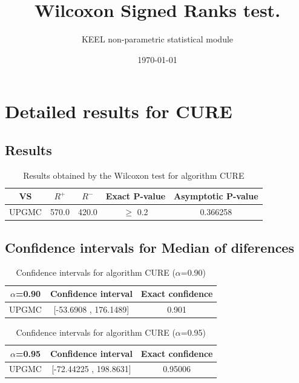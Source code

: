 \documentclass[a4paper,10pt]{article}
\title{Wilcoxon Signed Ranks test.}
\date{\today}
\author{KEEL non-parametric statistical module}
\begin{document}
\pagestyle{empty}
\maketitle
\thispagestyle{empty}



\section{Detailed results for CURE}


\subsection{Results}

\begin{table}[!htp]
\centering\small
\begin{tabular}{
|c|c|c|c|c|}
\hline
 VS & $R^{+}$ & $R^{-}$ & Exact P-value & Asymptotic P-value \\ \hline 
UPGMC & 570.0 & 420.0 & $\geq$ 0.2 & 0.366258\\ \hline 

\end{tabular}
\caption{Results obtained by the Wilcoxon test for algorithm CURE}
\end{table}

\subsection{Confidence intervals for Median of diferences}

\begin{table}[!htp]
\centering\small
\begin{tabular}{
|c|c|c|}
\hline
 $\alpha$=0.90 & Confidence interval & Exact confidence \\ \hline 
UPGMC & [-53.6908 , 176.1489] & 0.901\\ \hline 

\end{tabular}
\caption{Confidence intervals for algorithm CURE ($\alpha$=0.90)}
\end{table}
\begin{table}[!htp]
\centering\small
\begin{tabular}{
|c|c|c|}
\hline
 $\alpha$=0.95 & Confidence interval & Exact confidence \\ \hline 
UPGMC & [-72.44225 , 198.8631] & 0.95006\\ \hline 

\end{tabular}
\caption{Confidence intervals for algorithm CURE ($\alpha$=0.95)}
\end{table}
\end{document}
